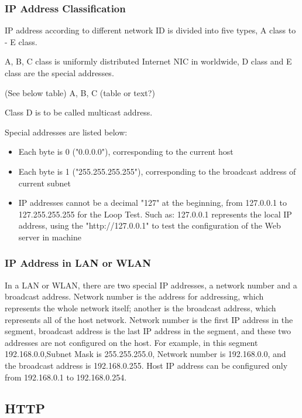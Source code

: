\subsubsection{IP Address Classification}

IP address according to different network ID is divided into five types, A class to - E class.  

A, B, C class is uniformly distributed Internet NIC in worldwide, D class and E class are the special addresses.  

(See below table) A, B, C (table or text?)

Class D is to be called multicast address.

Special addresses are listed below:

\begin{itemize}
	\item Each byte is 0 ("0.0.0.0"), corresponding to the current host
	\item Each byte is 1 ("255.255.255.255"), corresponding to the broadcast address of current subnet
	\item IP addresses cannot be a decimal "127" at the beginning, from 127.0.0.1 to 127.255.255.255 for the Loop Test. Such as: 127.0.0.1 represents the local IP address, using the "http://127.0.0.1" to test the configuration of the Web server in machine
\end{itemize}

\subsubsection{IP Address in LAN or WLAN}

In a LAN or WLAN, there are two special IP addresses, a network number and a broadcast address. Network number is the address for addressing, which represents the whole network itself; another is the broadcast address, which represents all of the host network. Network number is the first IP address in the segment, broadcast address is the last IP address in the segment, and these two addresses are not configured on the host. For example, in this segment 192.168.0.0,Subnet Mask is 255.255.255.0, Network number is 192.168.0.0, and the broadcast address is 192.168.0.255. Host IP address can be configured only from 192.168.0.1 to 192.168.0.254.  

\subsection{HTTP}

